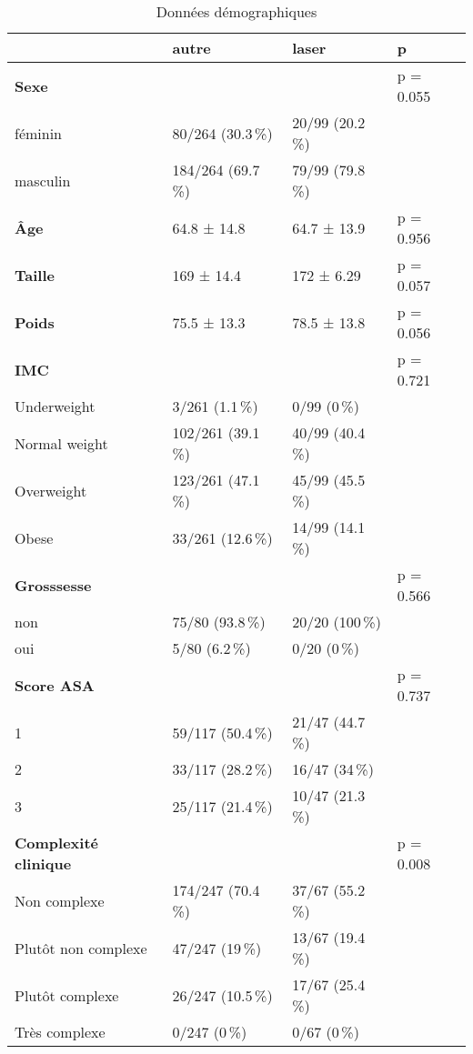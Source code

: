 \documentclass[a4paper,fontsize=10pt,french]{scrartcl}
\begin{document}
\begin{table}

\caption{\label{tab:tabcomp}Données démographiques}
\centering
\begin{tabular}[t]{l|l|l|l}
 \toprule
  & autre & laser & p\\
\midrule
\textbf{Sexe} &  &  & p = 0.055\\
 
féminin & 80/264 (30.3\,\%) & 20/99 (20.2\,\%) & \\
 
masculin & 184/264 (69.7\,\%) & 79/99 (79.8\,\%) & \\
\midrule
\textbf{Âge} & 64.8 ± 14.8 & 64.7 ± 13.9 & p = 0.956\\
\midrule
\textbf{Taille} & 169 ± 14.4 & 172 ± 6.29 & p = 0.057\\
\midrule
\textbf{Poids} & 75.5 ± 13.3 & 78.5 ± 13.8 & p = 0.056\\
\midrule
\textbf{IMC} &  &  & p = 0.721\\
 
Underweight & 3/261 (1.1\,\%) & 0/99 (0\,\%) & \\
 
Normal weight & 102/261 (39.1\,\%) & 40/99 (40.4\,\%) & \\
 
Overweight & 123/261 (47.1\,\%) & 45/99 (45.5\,\%) & \\
 
Obese & 33/261 (12.6\,\%) & 14/99 (14.1\,\%) & \\
\midrule
\textbf{Grosssesse} &  &  & p = 0.566\\
 
non & 75/80 (93.8\,\%) & 20/20 (100\,\%) & \\
 
oui & 5/80 (6.2\,\%) & 0/20 (0\,\%) & \\
\midrule
\textbf{Score ASA} &  &  & p = 0.737\\
 
1 & 59/117 (50.4\,\%) & 21/47 (44.7\,\%) & \\
 
2 & 33/117 (28.2\,\%) & 16/47 (34\,\%) & \\
 
3 & 25/117 (21.4\,\%) & 10/47 (21.3\,\%) & \\
\midrule
\textbf{Complexité clinique} &  &  & p = 0.008\\
 
Non complexe & 174/247 (70.4\,\%) & 37/67 (55.2\,\%) & \\
 
Plutôt non complexe & 47/247 (19\,\%) & 13/67 (19.4\,\%) & \\
 
Plutôt complexe & 26/247 (10.5\,\%) & 17/67 (25.4\,\%) & \\
 
Très complexe & 0/247 (0\,\%) & 0/67 (0\,\%) & \\
 \bottomrule
\end{tabular}
\end{table}
\end{document}
